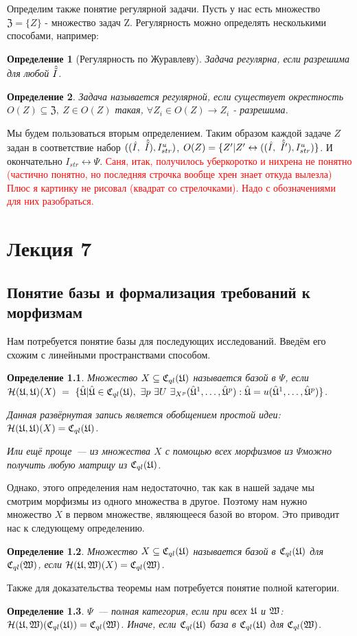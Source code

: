 \documentclass[a4paper, 12pt]{report}
\newtheorem{definition}{Определение}[chapter]
\begin{document}
Определим также понятие регулярной задачи. Пусть у нас есть множество $\mathfrak{Z}=\{Z\}$ - множество задач Z. Регулярность можно определять несколькими способами, например:
\begin{definition}[Регулярность по Журавлеву]
Задача регулярна, если разрешима для любой $\hat{\tilde{I}}$.
\end{definition}
\begin{definition}
Задача называется регулярной, если существует окрестность $O(Z)\subseteq \mathfrak{Z},\ Z\in O(Z)$ такая, $\forall Z_i\in O(Z) \rightarrow Z_i$ - разрешима.
\end{definition}
Мы будем пользоваться вторым определением.
Таким образом каждой задаче $Z$ задан в соответствие набор $((\hat{I},\ \hat{\tilde{I}}), I_{str}^u)$, $O(Z) = \{Z'| Z' \leftrightarrow ((\hat{I},\ \hat{\tilde{I}}'), I_{str}^u)\}$. 
И окончательно $I_{str} \leftrightarrow \Psi$.
\textcolor{red}{Саня, итак, получилось уберкоротко и нихрена не понятно (частично понятно, но последняя строчка вообще хрен знает откуда вылезла) Плюс я картинку не рисовал (квадрат со стрелочками). Надо с обозначениями для них разобраться.}

\chapter{Лекция 7}
\section{Понятие базы и формализация требований к морфизмам}
Нам потребуется понятие базы для последующих исследований. Введём его схожим с линейными пространствами способом.
\begin{definition}
Множество $X\subseteq \mathfrak{C}_{ql}(\mathfrak{U})$ называется базой в $\Psi$, если $\mathcal{H}(\mathfrak{U},\mathfrak{U})(X)\ =\ \{\hat{\mathfrak{U}}| \hat{\mathfrak{U}} \in \mathfrak{C}_{ql}(\mathfrak{U}),\ \exists p\ \exists U\ \exists_{X^p} (\hat{\mathfrak{U}}^1,\ldots,\hat{\mathfrak{U}}^p): \hat{\mathfrak{U}} = u(\hat{\mathfrak{U}}^1,\ldots,\hat{\mathfrak{U}}^p)\}$.

Данная развёрнутая запись является обобщением простой идеи:  $\mathcal{H}(\mathfrak{U},\mathfrak{U})(X) = \mathfrak{C}_{ql}(\mathfrak{U})$.

Или ещё проще~--- из множества $X$ с помощью всех морфизмов из $\Psi $можно получить любую матрицу из $\mathfrak{C}_{ql}(\mathfrak{U})$.
\end{definition}
Однако, этого определения нам недостаточно, так как в нашей задаче мы смотрим морфизмы из одного множества в другое. Поэтому нам нужно множество $X$ в первом множестве, являющееся базой во втором. Это приводит нас к следующему определению.
\begin{definition}
Множество $X\subseteq \mathfrak{C}_{ql}(\mathfrak{U})$ называется базой в $\mathfrak{C}_{ql}(\mathfrak{U})$ для $\mathfrak{C}_{ql}(\mathfrak{W})$, если $\mathcal{H}(\mathfrak{U},\mathfrak{W})(X) = \mathfrak{C}_{ql}(\mathfrak{W})$.
\end{definition}
Также для доказательства теоремы нам потребуется понятие полной категории.
\begin{definition}
$\Psi$~--- полная категория, если при всех $\mathfrak{U}$ и  $\mathfrak{W}$: $\mathcal{H}(\mathfrak{U},\mathfrak{W})(\mathfrak{C}_{ql}(\mathfrak{U})) = \mathfrak{C}_{ql}(\mathfrak{W})$. Иначе, если $\mathfrak{C}_{ql}(\mathfrak{U})$ база в $\mathfrak{C}_{ql}(\mathfrak{U})$ для $\mathfrak{C}_{ql}(\mathfrak{W})$.
\end{definition}
\end{document}
